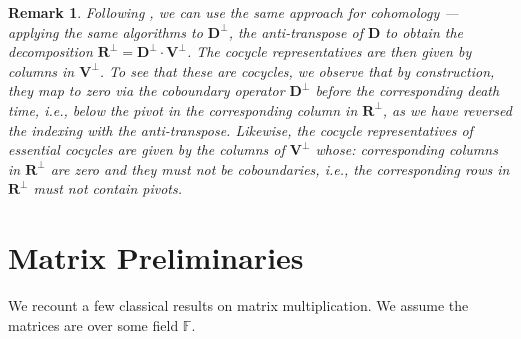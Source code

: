 \documentclass[10pt,a4paper]{article}
\newtheorem{remark}[theorem]{Remark}
\newcommand{\field}{\mathbb{F}}
\newcommand{\mat}[1]{\mathbf{#1}}
\newcommand{\Remark}[1]{\textcolor{blue}{[#1]}}
\begin{document}
\begin{remark} Following \cite{de2011dualities}, we can use the same approach for cohomology --- applying the same algorithms to $\mat{D}^{\perp
}$, the anti-transpose of $\mat{D}$ to obtain the decomposition $\mat{R}^{\perp
} = \mat{D}^{\perp}\cdot \mat{V}^{\perp
} $. The cocycle representatives are then given by columns in  $\mat{V}^{\perp}$. To see that these are cocycles, we observe that by construction, they map to zero via the coboundary operator $\mat{D}^{\perp
    }$ before the corresponding death time, i.e., below the pivot in the corresponding column in $\mat{R}^{\perp}$, as we have reversed the indexing with the anti-transpose. Likewise, the cocycle representatives of essential cocycles are given by the columns of $\mat{V}^{\perp}$ whose: corresponding columns in $\mat{R}^{\perp}$ are zero \emph{and} they must not be coboundaries, i.e., the corresponding rows in $\mat{R}^{\perp}$ must not contain pivots.
\end{remark}
\section{Matrix Preliminaries}
We recount a few classical results on matrix multiplication.  We assume the
matrices are over some field $\field$.
\end{document}
